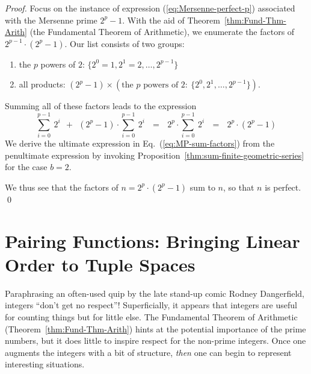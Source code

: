 \begin{proof}
Focus on the instance of expression (\ref{eq:Mersenne-perfect-p}) associated with the Mersenne prime $2^p-1$.  With the aid of Theorem~\ref{thm:Fund-Thm-Arith} (the Fundamental Theorem of Arithmetic), we enumerate the factors of $2^{p-1} \cdot (2^p-1)$.  Our list consists of two groups:
\begin{enumerate}
\item
the $p$ powers of $2$:  $\{2^0 =1, 2^1 = 2, \ldots, 2^{p-1}\}$
\medskip\item
all products: $(2^p-1) \times \left( 
\mbox{the $p$ powers of } 2: \ \{ 2^0, 2^1, \ldots, 2^{p-1}\} \right)$.
\end{enumerate}

\smallskip

\noindent
Summing all of these factors leads to the expression
\begin{equation}
\label{eq:MP-sum-factors}
\sum_{i=0}^{p-1} \ 2^i \ \ + \ \ (2^p-1) \cdot \sum_{i=0}^{p-1} \ 2^i
 \ \ \ = \ \ \  2^p \cdot \sum_{i=0}^{p-1} \ 2^i
 \ \ \ = \ \ \ 2^p \cdot (2^p -1)
\end{equation}
We derive the ultimate expression in Eq.~(\ref{eq:MP-sum-factors}) from the penultimate expression by invoking Proposition~\ref{thm:sum-finite-geometric-series} for the case $b=2$.

\smallskip

We thus see that the factors of $n = 2^p \cdot (2^p -1)$ sum to $n$, so that $n$ is perfect.  \qed
\end{proof}


\section{Pairing Functions: Bringing Linear Order to Tuple Spaces}
\label{sec:pairing}

Paraphrasing an often-used quip by the late stand-up comic Rodney Dangerfield, integers ``don't get no respect''!  Superficially, it appears that integers are useful for counting things but for little else.  The Fundamental Theorem of Arithmetic (Theorem~\ref{thm:Fund-Thm-Arith}) hints at the potential importance of the prime numbers, but it does little to inspire respect for the non-prime integers.  Once one augments the integers with a bit of structure, {\em then} one can begin to represent interesting situations.


